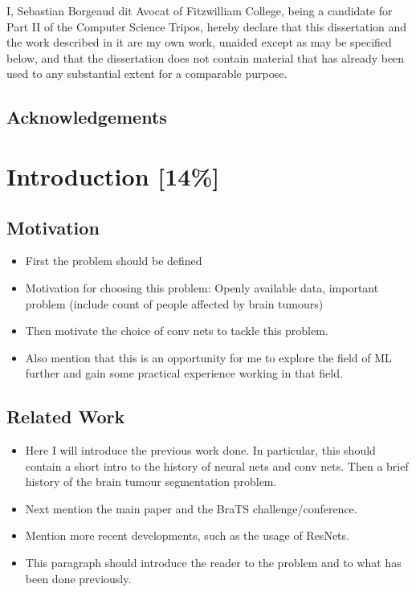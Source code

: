 \documentclass[12pt,a4paper,twoside,openright]{report}
\begin{document}
I, Sebastian Borgeaud dit Avocat of Fitzwilliam College, being a candidate for Part II of the Computer Science Tripos, hereby declare
that this dissertation and the work described in it are my own work,
unaided except as may be specified below, and that the dissertation
does not contain material that has already been used to any substantial
extent for a comparable purpose.

\bigskip
{}

\medskip
{}

\tableofcontents

\listoffigures

\newpage

\setlength{\parskip}{1em} %

\section*{Acknowledgements}



\pagestyle{headings}

\chapter{Introduction [14\%]}
\section{Motivation}
\begin{itemize}
	\item First the problem should be defined
	\item Motivation for choosing this problem: Openly available data, important problem (include count of people affected by brain tumours)
	\item Then motivate the choice of conv nets to tackle this problem.
	\item Also mention that this is an opportunity for me to explore the field of ML further and gain some practical experience working in that field.
\end{itemize}

\section{Related Work}
\begin{itemize}
	\item Here I will introduce the previous work done. In particular, this should contain a short intro to the history of neural nets and conv nets. Then a brief history of the brain tumour segmentation problem.
	\item Next mention the main paper \cite{pereira} and the BraTS challenge/conference.
	\item Mention more recent developments, such as the usage of ResNets.
	\item This paragraph should introduce the reader to the problem and to what has been done previously.
\end{itemize}
\end{document}
